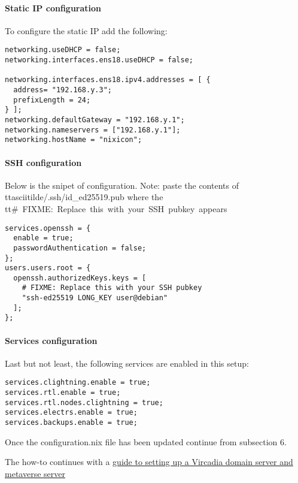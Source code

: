 \hypertarget{static-ip-configuration}{%
\paragraph{Static IP configuration}\label{static-ip-configuration}}

To configure the static IP add the following:

\begin{verbatim}
networking.useDHCP = false;
networking.interfaces.ens18.useDHCP = false;

networking.interfaces.ens18.ipv4.addresses = [ {
  address= "192.168.y.3";
  prefixLength = 24;
} ];
networking.defaultGateway = "192.168.y.1";
networking.nameservers = ["192.168.y.1"];
networking.hostName = "nixicon";
\end{verbatim}

\hypertarget{ssh-configuration}{%
\paragraph{SSH configuration}\label{ssh-configuration}}

Below is the snipet of configuration. Note: paste the contents of
tt{asciitilde{}/.ssh/id\_ed25519.pub} where the
tt{\#\ FIXME:\ Replace\ this\ with\ your\ SSH\ pubkey\ appears}

\begin{verbatim}
services.openssh = {
  enable = true;
  passwordAuthentication = false;
};
users.users.root = {
  openssh.authorizedKeys.keys = [
    # FIXME: Replace this with your SSH pubkey
    "ssh-ed25519 LONG_KEY user@debian"
  ];
};
\end{verbatim}

\hypertarget{services-configuration}{%
\paragraph{Services configuration}\label{services-configuration}}

Last but not least, the following services are enabled in this setup:

\begin{verbatim}
services.clightning.enable = true;
services.rtl.enable = true;
services.rtl.nodes.clightning = true;
services.electrs.enable = true;
services.backups.enable = true;
\end{verbatim}

Once the configuration.nix file has been updated continue from
subsection 6.

The how-to continues with a \href{./HOWTO_VIRCADIA.md}{guide to setting
up a Vircadia domain server and metaverse server}
